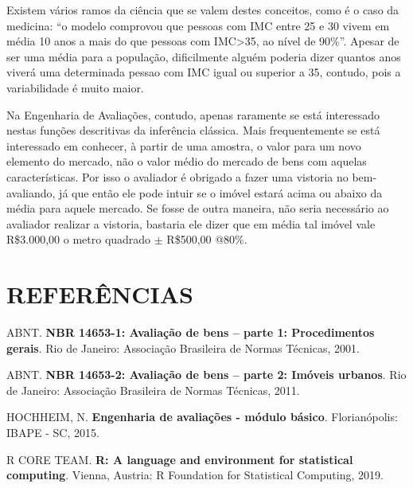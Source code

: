 \documentclass[a4paper, 12pt]{article}
\begin{document}
Existem vários ramos da ciência que se valem destes conceitos, como é o
caso da medicina: ``o modelo comprovou que pessoas com IMC entre 25 e 30
vivem em média 10 anos a mais do que pessoas com IMC\textgreater{}35, ao
nível de 90\%''. Apesar de ser uma média para a população, dificilmente
alguém poderia dizer quantos anos viverá uma determinada pessao com IMC
igual ou superior a 35, contudo, pois a variabilidade é muito maior.

Na Engenharia de Avaliações, contudo, apenas raramente se está
interessado nestas funções descritivas da inferência clássica. Mais
frequentemente se está interessado em conhecer, à partir de uma amostra,
o valor para um novo elemento do mercado, não o valor médio do mercado
de bens com aquelas características. Por isso o avaliador é obrigado a
fazer uma vistoria no bem-avaliando, já que então ele pode intuir se o
imóvel estará acima ou abaixo da média para aquele mercado. Se fosse de
outra maneira, não seria necessário ao avaliador realizar a vistoria,
bastaria ele dizer que em média tal imóvel vale R\$3.000,00 o metro
quadrado \(\pm\) R\$500,00 @80\%.

\hypertarget{referencias}{%
\section*{REFERÊNCIAS}\label{referencias}}

\hypertarget{refs}{}
\leavevmode\hypertarget{ref-NBR1465301}{}%
ABNT. \textbf{NBR 14653-1: Avaliação de bens -- parte 1: Procedimentos
gerais}. Rio de Janeiro: Associação Brasileira de Normas Técnicas, 2001.

\leavevmode\hypertarget{ref-NBR1465302}{}%
ABNT. \textbf{NBR 14653-2: Avaliação de bens -- parte 2: Imóveis
urbanos}. Rio de Janeiro: Associação Brasileira de Normas Técnicas,
2011.

\leavevmode\hypertarget{ref-hochheim}{}%
HOCHHEIM, N. \textbf{Engenharia de avaliações - módulo básico}.
Florianópolis: IBAPE - SC, 2015.

\leavevmode\hypertarget{ref-R}{}%
R CORE TEAM. \textbf{R: A language and environment for statistical
computing}. Vienna, Austria: R Foundation for Statistical Computing,
2019.
\end{document}
